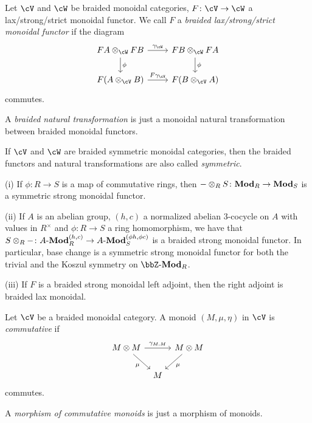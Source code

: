 \documentclass[a4paper,11pt,oneside,openany]{scrbook}
\begin{document}
\begin{defn}
	Let $\cV$ and $\cW$ be braided monoidal categories, $F\colon\cV\rightarrow\cW$ a lax/strong/strict monoidal functor. We call $F$ a \emph{braided lax/strong/strict monoidal functor} if the diagram
	\[
		\begin{tikzcd}
			FA\otimes_\cW FB\ar[r, "\gamma_\cW"]\ar[d, "\phi"]
			& FB\otimes_\cW FA\ar[d, "\phi"] \\
			F(A\otimes_\cV B)\ar[r, "F\gamma_\cV"]
			& F(B\otimes_\cV A)
		\end{tikzcd}
	\]
	commutes.

	A \emph{braided natural transformation} is just a monoidal natural transformation between braided monoidal functors.

	If $\cV$ and $\cW$ are braided symmetric monoidal categories, then the
    braided functors and natural transformations are also called
    \emph{symmetric}.
\end{defn}

\begin{exmp}
	\item[(i)] If $\phi\colon R\rightarrow S$ is a map of commutative rings,
        then $-\otimes_RS\colon{\normalfont\textbf{Mod}}_R\rightarrow{\normalfont\textbf{Mod}}_S$ is a symmetric strong
        monoidal functor.

	\item[(ii)] If $A$ is an abelian group, $(h,c)$ a normalized abelian
        3-cocycle on $A$ with values in $R^\times$ and $\phi\colon R\rightarrow
        S$ a ring homomorphism, we have that $S\otimes_R-\colon
        A\text{-}{\normalfont\textbf{Mod}}_R^{(h,c)}\rightarrow A\text{-}{\normalfont\textbf{Mod}}_S^{(\phi h,\phi c)}$ is
        a braided strong monoidal functor. In particular, base change is a
        symmetric strong monoidal functor for both the trivial and the Koszul
        symmetry on $\bbZ\text{-}\Mod_R$.

	\item[(iii)] If $F$ is a braided strong monoidal left adjoint, then the
        right adjoint is braided lax monoidal.
\end{exmp}

\begin{defn}
	Let $\cV$ be a braided monoidal category. A monoid $(M,\mu,\eta)$ in $\cV$
    is \emph{commutative} if
	\[
		\begin{tikzcd}[column sep=tiny]
			M\otimes M\ar[rr, "\gamma_{M,M}"]\ar[dr, swap, "\mu"]
			&& M\otimes M\ar[dl, "\mu"] \\
			& M
		\end{tikzcd}
	\]
	commutes.

	A \emph{morphism of commutative monoids} is just a morphism of monoids.
\end{defn}
\end{document}
